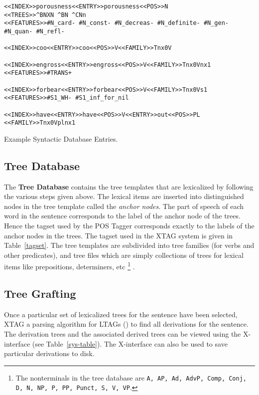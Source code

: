 \begin{table}[htb]
\begin{verbatim}
<<INDEX>>porousness<<ENTRY>>porousness<<POS>>N
<<TREES>>^BNXN ^BN ^CNn
<<FEATURES>>#N_card- #N_const- #N_decreas- #N_definite- #N_gen- 
#N_quan- #N_refl-

<<INDEX>>coo<<ENTRY>>coo<<POS>>V<<FAMILY>>Tnx0V

<<INDEX>>engross<<ENTRY>>engross<<POS>>V<<FAMILY>>Tnx0Vnx1
<<FEATURES>>#TRANS+

<<INDEX>>forbear<<ENTRY>>forbear<<POS>>V<<FAMILY>>Tnx0Vs1
<<FEATURES>>#S1_WH- #S1_inf_for_nil

<<INDEX>>have<<ENTRY>>have<<POS>>V<<ENTRY>>out<<POS>>PL
<<FAMILY>>Tnx0Vplnx1
\end{verbatim}   
\caption{Example Syntactic Database Entries.}

\label{syn-entries}
\end{table}

\subsection{Tree Database}
\label{tree-db}

The {\bf Tree Database} contains the tree templates that are
lexicalized by following the various steps given above. The lexical
items are inserted into distinguished nodes in the tree template
called the {\em anchor nodes}.  The part of speech of each word in the
sentence corresponds to the label of the anchor node of the trees.
Hence the tagset used by the POS Tagger corresponds exactly to the
labels of the anchor nodes in the trees.  The tagset used in the XTAG
system is given in Table~\ref{tagset}. The tree templates are
subdivided into tree families (for verbs and other predicates), and
tree files which are simply collections of trees for lexical items
like prepositions, determiners, etc%
\footnote{ The nonterminals in the tree database are {\tt A, AP, Ad,
    AdvP, Comp, Conj, D, N, NP, P, PP, Punct, S, V, VP}.}%
.

\subsection{Tree Grafting}

Once a particular set of lexicalized trees for the sentence have been
selected, XTAG a parsing algorithm for LTAGs
(\cite{schabesjoshi88,schabes90}) to find all derivations for the
sentence. The derivation trees and the associated derived trees can be
viewed using the X-interface (see Table~\ref{sys-table}). The
X-interface can also be used to save particular derivations to disk.

